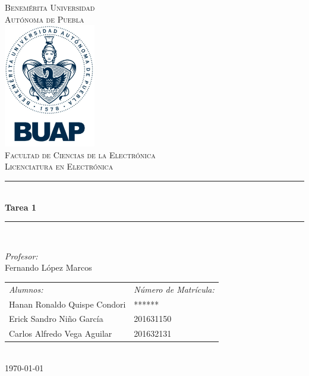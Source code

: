 \documentclass[12pt]{article}
\date{\today}
\begin{document}
\begin{titlepage}
\newcommand{\HRule}{\rule{\linewidth}{0.5mm}} 
\center
\textsc{\LARGE  Benemérita Universidad \\[0.2cm] Autónoma de Puebla}\\[1.5cm] 
\includegraphics[width=4cm]{IMAGENES/escudo}\\[1cm]
\textsc{\Large Facultad de Ciencias de la Electrónica}\\[0.5cm] 
\textsc{\large Licenciatura en Electrónica}\\[0.5cm]
\HRule \\[0.4cm]
{ \huge \bfseries Tarea 1}\\[0.4cm] 
\HRule \\[1.5cm]
\begin{minipage}{\textwidth}
\center 

\emph{Profesor:} \\
Fernando López Marcos \\[1cm]

\begin{tabular}{ll}
\emph{Alumnos:} & \emph{Número de Matrícula:}\\
Hanan Ronaldo Quispe Condori  & ****** \\
Erick Sandro Niño García & 201631150\\
Carlos Alfredo Vega Aguilar & 201632131 \\
\end{tabular}
\end{minipage}\\[2cm]
\today
\end{titlepage}



\end{document}

